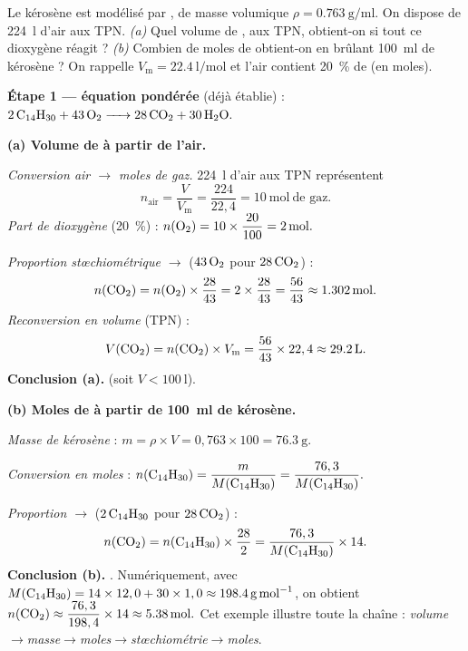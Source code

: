 \documentclass[11pt,a4paper]{article}
\newcommand{\Vm}{V_{\mathrm{m}}}          %
\begin{document}
\begin{exemple}
Le kérosène est modélisé par , de masse volumique $\rho=\SI{0,763}{\gram\per\milli\litre}$.
On dispose de \SI{224}{\litre} d'air aux TPN. \emph{(a)} Quel volume de , aux TPN, obtient-on
si tout ce dioxygène réagit ? \emph{(b)} Combien de moles de  obtient-on en brûlant
\SI{100}{\milli\litre} de kérosène ? On rappelle $\Vm=\SI{22,4}{\litre\per\mole}$ et l'air contient
\SI{20}{\percent} de  (en moles).

\smallskip
\textbf{Étape 1 — équation pondérée} (déjà établie) :
$\ce{2 C14H30 + 43 O2 -> 28 CO2 + 30 H2O}.$

\smallskip
\textbf{(a) Volume de  à partir de l'air.}

\emph{Conversion air $\to$ moles de gaz.} \SI{224}{\litre} d'air aux TPN représentent
\[
n_{\text{air}}=\frac{V}{\Vm}=\frac{224}{22,4}=\SI{10}{\mole}\ \text{de gaz.}
\]
\emph{Part de dioxygène} (\SI{20}{\percent}) : $n(\ce{O2})=10\times\dfrac{20}{100}=\SI{2}{\mole}.$

\emph{Proportion stœchiométrique  $\to$ } ($43\,\ce{O2}$ pour $28\,\ce{CO2}$) :
\[
n(\ce{CO2})=n(\ce{O2})\times\frac{28}{43}=2\times\frac{28}{43}=\frac{56}{43}\approx\SI{1,302}{\mole}.
\]
\emph{Reconversion en volume} (TPN) :
\[
V(\ce{CO2})=n(\ce{CO2})\times\Vm=\frac{56}{43}\times22,4\approx\SI{29,2}{\litre}.
\]
\textbf{Conclusion (a).}  (soit $V<\SI{100}{\litre}$).

\smallskip
\textbf{(b) Moles de  à partir de \SI{100}{\milli\litre} de kérosène.}

\emph{Masse de kérosène} : $m=\rho\times V=0,763\times100=\SI{76,3}{\gram}.$

\emph{Conversion en moles} : $n(\ce{C14H30})=\dfrac{m}{M(\ce{C14H30})}=\dfrac{76,3}{M(\ce{C14H30})}.$

\emph{Proportion  $\to$ } ($2\,\ce{C14H30}$ pour $28\,\ce{CO2}$) :
\[
n(\ce{CO2})=n(\ce{C14H30})\times\frac{28}{2}=\frac{76,3}{M(\ce{C14H30})}\times 14 .
\]
\textbf{Conclusion (b).} . Numériquement,
avec $M(\ce{C14H30})=14\times12,0+30\times1,0\approx\SI{198,4}{\gram\per\mole}$, on obtient
$n(\ce{CO2})\approx\dfrac{76,3}{198,4}\times14\approx\SI{5,38}{\mole}.$ Cet exemple illustre toute la
chaîne : \emph{volume$\to$masse$\to$moles$\to$stœchiométrie$\to$moles}.
\end{exemple}
\end{document}
